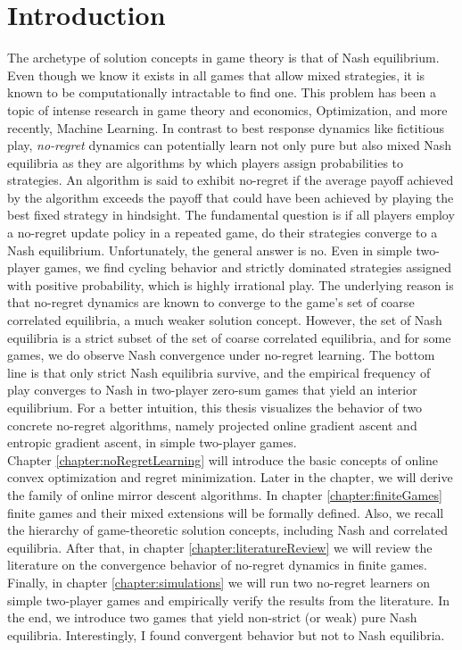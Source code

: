 
\chapter{Introduction}\label{chapter:introduction}

The archetype of solution concepts in game theory is that of Nash equilibrium. Even though we know it exists in all games that allow mixed strategies, it is known to be computationally intractable to find one. This problem has been a topic of intense research in game theory and economics, Optimization, and more recently, Machine Learning. In contrast to best response dynamics like fictitious play, \textit{no-regret} dynamics can potentially learn not only pure but also mixed Nash equilibria as they are algorithms by which players assign probabilities to strategies. An algorithm is said to exhibit no-regret if the average payoff achieved by the algorithm exceeds the payoff that could have been achieved by playing the best fixed strategy in hindsight. The fundamental question is if all players employ a no-regret update policy in a repeated game, do their strategies converge to a Nash equilibrium. Unfortunately, the general answer is no. Even in simple two-player games, we find cycling behavior and strictly dominated strategies assigned with positive probability, which is highly irrational play. The underlying reason is that no-regret dynamics are known to converge to the game's set of coarse correlated equilibria, a much weaker solution concept. However, the set of Nash equilibria is a strict subset of the set of coarse correlated equilibria, and for some games, we do observe Nash convergence under no-regret learning. The bottom line is that only strict Nash equilibria survive, and the empirical frequency of play converges to Nash in two-player zero-sum games that yield an interior equilibrium. For a better intuition, this thesis visualizes the behavior of two concrete no-regret algorithms, namely projected online gradient ascent and entropic gradient ascent, in simple two-player games. \\

Chapter \ref{chapter:noRegretLearning} will introduce the basic concepts of online convex optimization and regret minimization. Later in the chapter, we will derive the family of online mirror descent algorithms. In chapter \ref{chapter:finiteGames} finite games and their mixed extensions will be formally defined. Also, we recall the hierarchy of game-theoretic solution concepts, including Nash and correlated equilibria. After that, in chapter \ref{chapter:literatureReview} we will review the literature on the convergence behavior of no-regret dynamics in finite games. Finally, in chapter \ref{chapter:simulations} we will run two no-regret learners on simple two-player games and empirically verify the results from the literature. In the end, we introduce two games that yield non-strict (or weak) pure Nash equilibria. Interestingly, I found convergent behavior but not to Nash equilibria.


